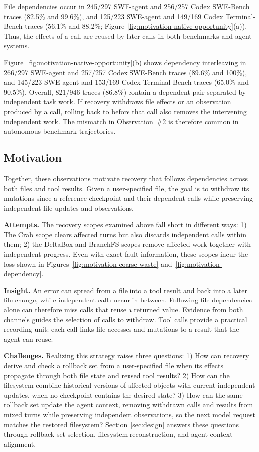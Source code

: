 File dependencies occur in 245/297 SWE-agent and 256/257 Codex SWE-Bench
traces (82.5\% and 99.6\%), and 125/223 SWE-agent and 149/169 Codex
Terminal-Bench traces (56.1\% and 88.2\%; Figure~\ref{fig:motivation-native-opportunity}(a)). Thus, the effects of a call
are reused by later calls in both benchmarks and agent systems.

Figure~\ref{fig:motivation-native-opportunity}(b) shows dependency interleaving in 266/297 SWE-agent and 257/257
Codex SWE-Bench traces (89.6\% and 100\%), and 145/223 SWE-agent and
153/169 Codex Terminal-Bench traces (65.0\% and 90.5\%). Overall,
821/946 traces (86.8\%) contain a dependent pair separated by independent
task work. If recovery withdraws file effects or an observation produced by
a call, rolling back to before that call also removes the intervening
independent work. The mismatch in Observation~\#2 is therefore common in
autonomous benchmark trajectories.

\subsection{Motivation}
\label{sec:recovery-challenges}

Together, these observations motivate recovery that follows dependencies
across both files and tool results. Given a user-specified file, the goal
is to withdraw its mutations since a reference checkpoint and their
dependent calls while preserving independent file updates and observations.

\textbf{Attempts.}
The recovery scopes examined above fall short in different ways:
1) The Crab scope clears affected turns but also discards
independent calls within them; 2) the DeltaBox and BranchFS scopes remove
affected work together with independent progress. Even with exact fault
information, these scopes incur the loss shown in
Figures~\ref{fig:motivation-coarse-waste} and~\ref{fig:motivation-dependency}.

\textbf{Insight.}
An error can spread from a file into a tool result and back into a later
file change, while independent calls occur in between. Following file
dependencies alone can therefore miss calls that reuse a returned value.
Evidence from both channels guides the selection of calls to withdraw.
Tool calls provide a practical recording unit: each call links
file accesses and mutations to a result that the agent can reuse.

\textbf{Challenges.}
Realizing this strategy raises three questions:
1) How can recovery derive and check a rollback set from a user-specified
file when its effects propagate through both file state and reused tool results?
2) How can the filesystem combine historical versions of affected
objects with current independent updates, when no checkpoint contains the
desired state?
3) How can the same rollback set update the agent context, removing
withdrawn calls and results from mixed turns while preserving independent
observations, so the next model request matches the restored filesystem?
Section~\ref{sec:design} answers these questions through rollback-set
selection, filesystem reconstruction, and agent-context alignment.
